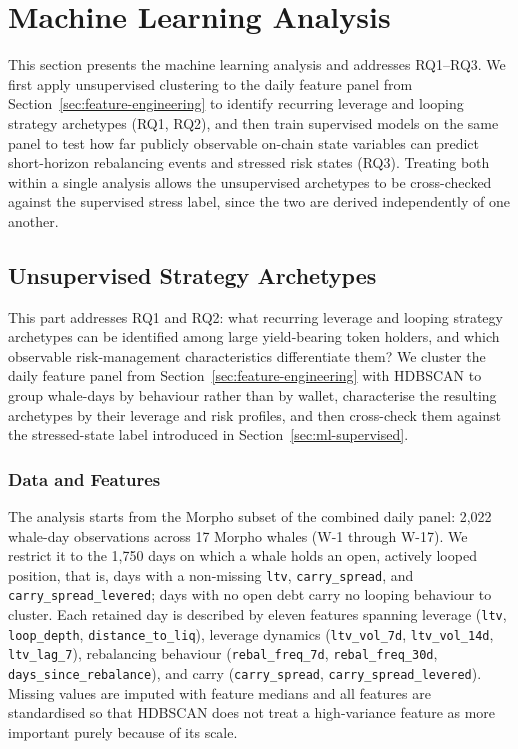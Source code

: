 \section{Machine Learning Analysis}
\label{sec:ml-analysis}

This section presents the machine learning analysis and addresses RQ1--RQ3.
We first apply unsupervised clustering to the daily feature panel from
Section~\ref{sec:feature-engineering} to identify recurring leverage and
looping strategy archetypes (RQ1, RQ2), and then train supervised models on
the same panel to test how far publicly observable on-chain state variables
can predict short-horizon rebalancing events and stressed risk states (RQ3).
Treating both within a single analysis allows the unsupervised archetypes to
be cross-checked against the supervised stress label, since the two are
derived independently of one another.

\subsection{Unsupervised Strategy Archetypes}
\label{sec:archetype-analysis}

This part addresses RQ1 and RQ2: what recurring leverage and looping
strategy archetypes can be identified among large yield-bearing token
holders, and which observable risk-management characteristics
differentiate them? We cluster the daily feature panel from
Section~\ref{sec:feature-engineering} with HDBSCAN to group whale-days by
behaviour rather than by wallet, characterise the resulting archetypes by
their leverage and risk profiles, and then cross-check them against the
stressed-state label introduced in Section~\ref{sec:ml-supervised}.

\subsubsection{Data and Features}
\label{sec:arch-data}

The analysis starts from the Morpho subset of the combined daily panel:
2{,}022 whale-day observations across 17 Morpho whales (W-1 through W-17).
We restrict it to the 1{,}750 days on which a whale holds an open,
actively looped position, that is, days with a non-missing \texttt{ltv},
\texttt{carry\_spread}, and \texttt{carry\_spread\_levered}; days with no
open debt carry no looping behaviour to cluster. Each retained day is
described by eleven features
spanning leverage (\texttt{ltv}, \texttt{loop\_depth},
\texttt{distance\_to\_liq}), leverage dynamics (\texttt{ltv\_vol\_7d},
\texttt{ltv\_vol\_14d}, \texttt{ltv\_lag\_7}), rebalancing behaviour
(\texttt{rebal\_freq\_7d}, \texttt{rebal\_freq\_30d},
\texttt{days\_since\_rebalance}), and carry (\texttt{carry\_spread},
\texttt{carry\_spread\_levered}). Missing values are imputed with feature
medians and all features are standardised so that HDBSCAN does not treat
a high-variance feature as more important purely because of its scale.

